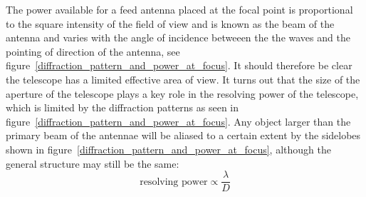 \documentclass[a4paper,10pt]{report}
\begin{document}
The power available for a feed antenna placed at the focal point is proportional to the square intensity of the field of view and is known as the beam of the antenna and varies with the angle of incidence betweeen the the waves and the pointing of
direction of the antenna, see figure~\ref{diffraction_pattern_and_power_at_focus}. It should therefore be clear the telescope has a limited effective area of view. It turns out that the size of the aperture of the telescope plays a key role
in the resolving power of the telescope, which is limited by the diffraction patterns as seen in figure~\ref{diffraction_pattern_and_power_at_focus}. Any object larger than the primary beam of the antennae will be aliased to a certain
extent by the sidelobes shown in figure~\ref{diffraction_pattern_and_power_at_focus}, although the general structure may still be the same:
\begin{equation*}
 \text{resolving power} \propto \frac{\lambda}{D}
\end{equation*}
\end{document}
